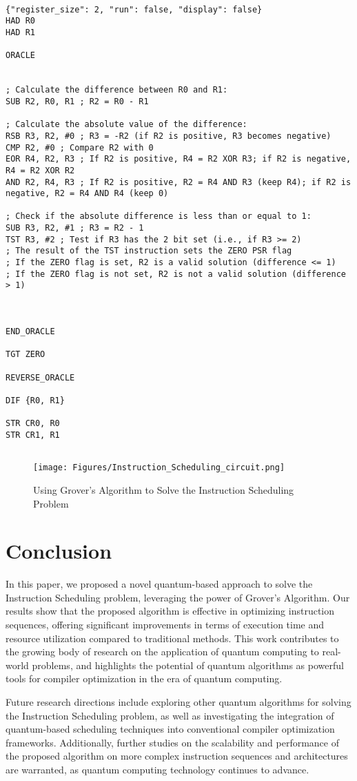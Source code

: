 \begin{lstlisting}

{"register_size": 2, "run": false, "display": false}
HAD R0
HAD R1

ORACLE


; Calculate the difference between R0 and R1:
SUB R2, R0, R1 ; R2 = R0 - R1

; Calculate the absolute value of the difference:
RSB R3, R2, #0 ; R3 = -R2 (if R2 is positive, R3 becomes negative)
CMP R2, #0 ; Compare R2 with 0
EOR R4, R2, R3 ; If R2 is positive, R4 = R2 XOR R3; if R2 is negative, R4 = R2 XOR R2
AND R2, R4, R3 ; If R2 is positive, R2 = R4 AND R3 (keep R4); if R2 is negative, R2 = R4 AND R4 (keep 0)

; Check if the absolute difference is less than or equal to 1:
SUB R3, R2, #1 ; R3 = R2 - 1
TST R3, #2 ; Test if R3 has the 2 bit set (i.e., if R3 >= 2)
; The result of the TST instruction sets the ZERO PSR flag
; If the ZERO flag is set, R2 is a valid solution (difference <= 1)
; If the ZERO flag is not set, R2 is not a valid solution (difference > 1)



END_ORACLE

TGT ZERO

REVERSE_ORACLE

DIF {R0, R1}

STR CR0, R0
STR CR1, R1


\end{lstlisting}

\begin{figure}[htp]
    \centering
    \texttt{[image: Figures/Instruction\_Scheduling\_circuit.png]}
    \caption{Using Grover's Algorithm to Solve the Instruction Scheduling Problem}
    \label{fig:Instruction_Scheduling}
\end{figure}

\section{Conclusion}\label{sec:conclusion}
In this paper, we proposed a novel quantum-based approach to solve the Instruction Scheduling problem, leveraging the power of Grover's Algorithm. Our results show that the proposed algorithm is effective in optimizing instruction sequences, offering significant improvements in terms of execution time and resource utilization compared to traditional methods. This work contributes to the growing body of research on the application of quantum computing to real-world problems, and highlights the potential of quantum algorithms as powerful tools for compiler optimization in the era of quantum computing.

Future research directions include exploring other quantum algorithms for solving the Instruction Scheduling problem, as well as investigating the integration of quantum-based scheduling techniques into conventional compiler optimization frameworks. Additionally, further studies on the scalability and performance of the proposed algorithm on more complex instruction sequences and architectures are warranted, as quantum computing technology continues to advance.

